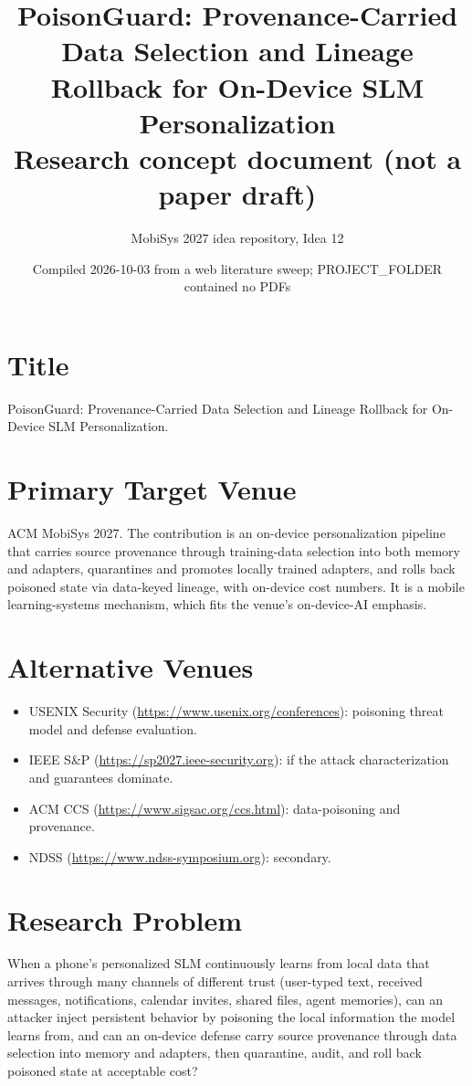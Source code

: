 \documentclass[11pt]{article}
\title{PoisonGuard: Provenance-Carried Data Selection and Lineage Rollback for On-Device SLM Personalization\\
\large Research concept document (not a paper draft)}
\author{MobiSys 2027 idea repository, Idea 12}
\date{Compiled 2026-10-03 from a web literature sweep; PROJECT\_FOLDER contained no PDFs}
\begin{document}
\maketitle

\section{Title}
PoisonGuard: Provenance-Carried Data Selection and Lineage Rollback for On-Device SLM Personalization.

\section{Primary Target Venue}
ACM MobiSys 2027. The contribution is an on-device personalization pipeline that carries source provenance through training-data selection into both memory and adapters, quarantines and promotes locally trained adapters, and rolls back poisoned state via data-keyed lineage, with on-device cost numbers. It is a mobile learning-systems mechanism, which fits the venue's on-device-AI emphasis.

\section{Alternative Venues}
\begin{itemize}
  \item USENIX Security (\url{https://www.usenix.org/conferences}): poisoning threat model and defense evaluation.
  \item IEEE S\&P (\url{https://sp2027.ieee-security.org}): if the attack characterization and guarantees dominate.
  \item ACM CCS (\url{https://www.sigsac.org/ccs.html}): data-poisoning and provenance.
  \item NDSS (\url{https://www.ndss-symposium.org}): secondary.
\end{itemize}

\section{Research Problem}
When a phone's personalized SLM continuously learns from local data that arrives through many channels of different trust (user-typed text, received messages, notifications, calendar invites, shared files, agent memories), can an attacker inject persistent behavior by poisoning the local information the model learns from, and can an on-device defense carry source provenance through data selection into memory and adapters, then quarantine, audit, and roll back poisoned state at acceptable cost?
\end{document}
